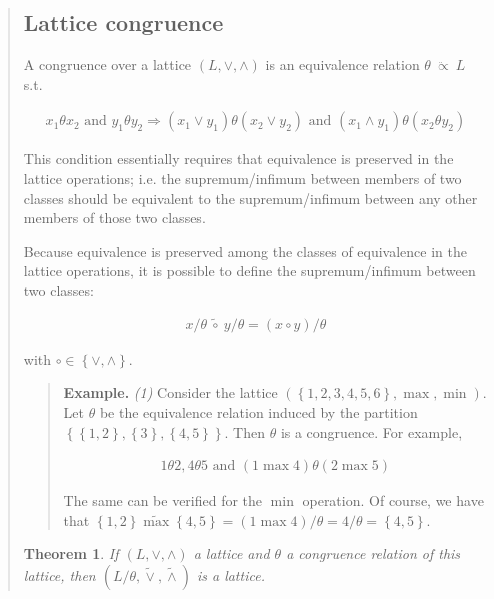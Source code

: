 \documentclass[a4paper, 12pt]{article}
\newtheorem{theorem}{Theorem}
\theoremstyle{definition}
\theoremstyle{definition}
\theoremstyle{definition}
\begin{document}
\begin{quote}
\subsection{Lattice congruence}

A congruence over a lattice $(L, \lor , \land )$ is an equivalence relation
$\theta ~ \ddot{\propto} ~ L$ s.t. 

\begin{align*}
    x_1 \theta x_2 \text{ and } y_1 \theta y_2 \Rightarrow (x_1 \lor  y_1)
    \theta (x_2 \lor  y_2) \text{ and } (x_1 \land y_1) \theta (x_2 \theta y_2)
\end{align*}

This condition essentially requires that equivalence is preserved in the
lattice operations; i.e. the supremum/infimum between members of two classes
should be equivalent to the supremum/infimum between any other members of those
two classes. 

Because equivalence is preserved among the classes of equivalence in the
lattice operations, it is possible to define the supremum/infimum between 
two classes:

\begin{align*}
    x / \theta ~ \widetilde{\circ } ~ y / \theta = (x \circ y) / \theta
\end{align*}

with $\circ \in \left\{ \lor , \land  \right\} $.

\small
\begin{quote}

\textbf{Example.} \textit{(1)} Consider the lattice $\left( \left\{ 1, 2, 3, 4,
5, 6\right\}, \max, \min  \right) $. Let $\theta$ be the equivalence relation
induced by the partition $\left\{ \left\{ 1, 2 \right\}, \left\{ 3 \right\},
\left\{ 4, 5 \right\}   \right\} $. Then $\theta$ is a congruence. For example, 

\begin{align*}
    1\theta 2, 4 \theta 5 \text{ and } (1 \max 4) \theta (2 \max 5)
\end{align*}

The same can be verified for the $\min$ operation. Of course, we have that
$\left\{ 1, 2 \right\} \widetilde{\max} \left\{ 4, 5 \right\} = (1 \max  4) /
\theta = 4 / \theta = \left\{ 4, 5 \right\} $. 

\end{quote}
\normalsize

\begin{theorem}
    If $(L, \lor , \land )$ a lattice and $\theta$ a congruence relation of this
    lattice, then $(L / \theta, \widetilde{ \lor  }, \widetilde{ \land  }  )$ is
    a lattice.
\end{theorem}


\end{quote}
\end{document}
